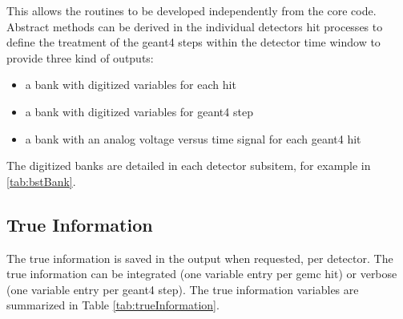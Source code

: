 This allows the routines to
be developed independently from the core code. Abstract methods can be derived in the individual detectors hit processes
to define the treatment of the geant4 steps within the detector time window to provide three kind of outputs:

\begin{itemize}
	\item a bank with digitized variables for each hit
	\item a bank with digitized variables for geant4 step
	\item a bank with an analog voltage versus time signal for each geant4 hit
\end{itemize}

The digitized banks are detailed in each detector subsitem, for example in \ref{tab:bstBank}.

\subsection{True Information}

The true information is saved in the output when requested, per detector. The true information can
be integrated (one variable entry per gemc hit) or verbose (one variable entry per geant4 step).
The true information variables are summarized in Table \ref{tab:trueInformation}.

